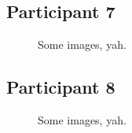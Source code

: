 \clearpage

\subsection{Participant 7}

\begin{figure}[h]
	\caption{Some images, yah.}
\end{figure}

\lipsum[1]


\clearpage

\subsection{Participant 8}

\begin{figure}[h]
	\caption{Some images, yah.}
\end{figure}

